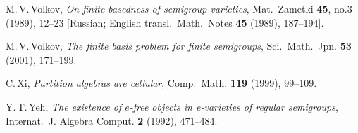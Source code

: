 \documentclass[11pt,reqno]{amsart}
\numberwithin{equation}{section}
\theoremstyle{remark}
\begin{document}
\begin{thebibliography}{99}



M.\,V.\,Volkov, \emph{On finite basedness of semigroup varieties},
Mat.\  Zametki \textbf{ 45}, no.3 (1989),  12--23 [Russian;
English transl.\ Math.\ Notes \textbf{ 45} (1989), 187--194].

M.\,V.\,Volkov, \emph{The finite basis problem for finite
semigroups}, Sci.\ Math.\ Jpn. \textbf{53} (2001), 171--199.

C.\,Xi, \emph{Partition algebras are cellular}, Comp.\ Math.
\textbf{119} (1999), 99--109.

Y.\,T.\,Yeh, \emph{The existence of $e$-free objects in
e-varieties of regular semigroups}, Internat.\ J. Algebra Comput.
\textbf{ 2} (1992), 471--484.
\end{thebibliography}
\end{document}
